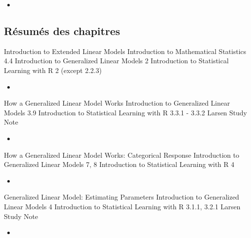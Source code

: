 \documentclass[12pt, titlepage, french]{report}
\begin{document}
\begin{YTB_vids}
\begin{itemize}
	\item	
\end{itemize}
\end{YTB_vids}

\subsection{Résumés des chapitres}

\begin{CHPT_SUMM_AUTO_NUMB}[label = {L.-42}]{Introduction to Extended Linear Models}
Introduction to Mathematical Statistics 4.4
Introduction to Generalized Linear Models 2
Introduction to Statistical Learning with R 2 (except 2.2.3)
	\begin{itemize}
		\item	
	\end{itemize}
\end{CHPT_SUMM_AUTO_NUMB}

\begin{CHPT_SUMM_AUTO_NUMB}[label = {L.-43}]{How a Generalized Linear Model Works}
Introduction to Generalized Linear Models 3.9
Introduction to Statistical Learning with R 3.3.1 - 3.3.2
Larsen Study Note
	\begin{itemize}
		\item	
	\end{itemize}
\end{CHPT_SUMM_AUTO_NUMB}

\begin{CHPT_SUMM_AUTO_NUMB}[label = {L.-44}]{How a Generalized Linear Model Works: Categorical Response}
Introduction to Generalized Linear Models 7, 8
Introduction to Statistical Learning with R 4
	\begin{itemize}
		\item	
	\end{itemize}
\end{CHPT_SUMM_AUTO_NUMB}

\begin{CHPT_SUMM_AUTO_NUMB}[label = {L.-45}]{Generalized Linear Model: Estimating Parameters}
Introduction to Generalized Linear Models 4
Introduction to Statistical Learning with R 3.1.1, 3.2.1
Larsen Study Note
	\begin{itemize}
		\item	
	\end{itemize}
\end{CHPT_SUMM_AUTO_NUMB}
\end{document}
